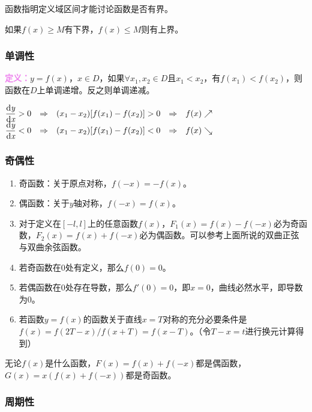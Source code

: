\documentclass[UTF8, 12pt]{ctexart}
\begin{document}
        函数指明定义域区间才能讨论函数是否有界。

        如果$f(x)\geqslant M$有下界，$f(x)\leqslant M$则有上界。

        \subsubsection{单调性}

        \textcolor{violet}{\textbf{定义：}}$y=f(x)$，$x\in D$，如果$\forall x_1,x_2\in D$且$x_1<x_2$，有$f(x_1)<f(x_2)$，则函数在$D$上单调递增。反之则单调递减。

        \medskip

        $\begin{matrix}
             \dfrac{\rm{d}\textit{y}}{\rm{d}\textit{x}}>0 & \Rightarrow & (x_1-x_2)[f(x_1)-f(x_2)]>0 & \Rightarrow & f(x)\nearrow \\
             \dfrac{\rm{d}\textit{y}}{\rm{d}\textit{x}}<0 & \Rightarrow & (x_1-x_2)[f(x_1)-f(x_2)]<0 & \Rightarrow & f(x)\searrow
        \end{matrix}
        $

        \subsubsection{奇偶性}

        \begin{enumerate}
            \item 奇函数：关于原点对称，$f(-x)=-f(x)$。
            \item 偶函数：关于$y$轴对称，$f(-x)=f(x)$。
            \item 对于定义在$[-l,l]$上的任意函数$f(x)$，$F_1(x)=f(x)-f(-x)$必为奇函数，$F_2(x)=f(x)+f(-x)$必为偶函数。可以参考上面所说的双曲正弦与双曲余弦函数。
            \item 若奇函数在0处有定义，那么$f(0)=0$。
            \item 若偶函数在0处存在导数，那么$f'(0)=0$，即$x=0$，曲线必然水平，即导数为0。
            \item 若函数$y=f(x)$的函数关于直线$x=T$对称的充分必要条件是$f(x)=f(2T-x)/f(x+T)=f(x-T)$。（令$T-x=t$进行换元计算得到）
        \end{enumerate}

        无论$f(x)$是什么函数，$F(x)=f(x)+f(-x)$都是偶函数，$G(x)=x(f(x)+f(-x))$都是奇函数。

        \subsubsection{周期性}
\end{document}
